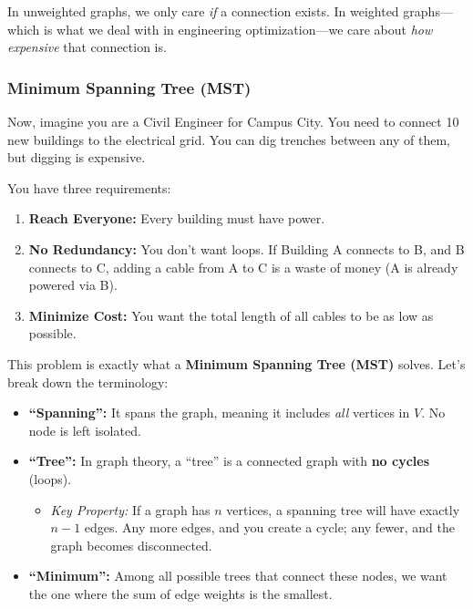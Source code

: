 \documentclass[
  letterpaper,
  DIV=11,
  numbers=noendperiod]{scrreprt}
\providecommand{\tightlist}{%
  \setlength{\itemsep}{0pt}\setlength{\parskip}{0pt}}
\begin{document}
\begin{tcolorbox}[enhanced jigsaw, leftrule=.75mm, rightrule=.15mm, colback=white, colbacktitle=quarto-callout-note-color!10!white, arc=.35mm, opacityback=0, toptitle=1mm, bottomrule=.15mm, bottomtitle=1mm, titlerule=0mm, title=\textcolor{quarto-callout-note-color}{\faInfo}\hspace{0.5em}{Why do weights matter?}, toprule=.15mm, left=2mm, coltitle=black, breakable, colframe=quarto-callout-note-color-frame, opacitybacktitle=0.6]

In unweighted graphs, we only care \emph{if} a connection exists. In
weighted graphs---which is what we deal with in engineering
optimization---we care about \emph{how expensive} that connection is.

\end{tcolorbox}

\subsubsection{Minimum Spanning Tree
(MST)}\label{minimum-spanning-tree-mst}

Now, imagine you are a Civil Engineer for Campus City. You need to
connect 10 new buildings to the electrical grid. You can dig trenches
between any of them, but digging is expensive.

You have three requirements:

\begin{enumerate}
\def\labelenumi{\arabic{enumi}.}
\tightlist
\item
  \textbf{Reach Everyone:} Every building must have power.
\item
  \textbf{No Redundancy:} You don't want loops. If Building A connects
  to B, and B connects to C, adding a cable from A to C is a waste of
  money (A is already powered via B).
\item
  \textbf{Minimize Cost:} You want the total length of all cables to be
  as low as possible.
\end{enumerate}

This problem is exactly what a \textbf{Minimum Spanning Tree (MST)}
solves. Let's break down the terminology:

\begin{itemize}
\item
  \textbf{``Spanning'':} It spans the graph, meaning it includes
  \emph{all} vertices in \(V\). No node is left isolated.
\item
  \textbf{``Tree'':} In graph theory, a ``tree'' is a connected graph
  with \textbf{no cycles} (loops).

  \begin{itemize}
  \tightlist
  \item
    \emph{Key Property:} If a graph has \(n\) vertices, a spanning tree
    will have exactly \(n-1\) edges. Any more edges, and you create a
    cycle; any fewer, and the graph becomes disconnected.
  \end{itemize}
\item
  \textbf{``Minimum'':} Among all possible trees that connect these
  nodes, we want the one where the sum of edge weights is the smallest.
\end{itemize}
\end{document}
